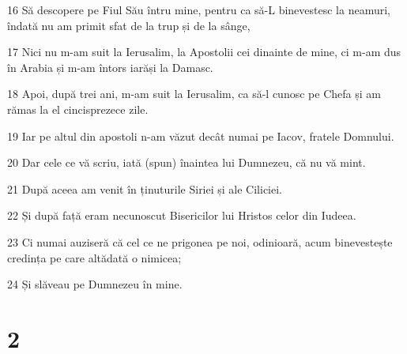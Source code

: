 \par 16 Să descopere pe Fiul Său întru mine, pentru ca să-L binevestesc la neamuri, îndată nu am primit sfat de la trup și de la sânge,
\par 17 Nici nu m-am suit la Ierusalim, la Apostolii cei dinainte de mine, ci m-am dus în Arabia și m-am întors iarăși la Damasc.
\par 18 Apoi, după trei ani, m-am suit la Ierusalim, ca să-l cunosc pe Chefa și am rămas la el cincisprezece zile.
\par 19 Iar pe altul din apostoli n-am văzut decât numai pe Iacov, fratele Domnului.
\par 20 Dar cele ce vă scriu, iată (spun) înaintea lui Dumnezeu, că nu vă mint.
\par 21 După aceea am venit în ținuturile Siriei și ale Ciliciei.
\par 22 Și după față eram necunoscut Bisericilor lui Hristos celor din Iudeea.
\par 23 Ci numai auziseră că cel ce ne prigonea pe noi, odinioară, acum binevestește credința pe care altădată o nimicea;
\par 24 Și slăveau pe Dumnezeu în mine.

\chapter{2}

